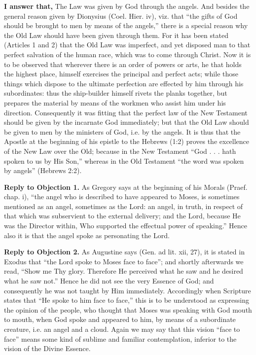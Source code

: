 \textbf{I answer that,} The Law was given by God through the angels. And besides the general reason given by Dionysius (Coel. Hier. iv), viz. that ``the gifts of God should be brought to men by means of the angels,'' there is a special reason why the Old Law should have been given through them. For it has been stated (Articles 1 and 2) that the Old Law was imperfect, and yet disposed man to that perfect salvation of the human race, which was to come through Christ. Now it is to be observed that wherever there is an order of powers or arts, he that holds the highest place, himself exercises the principal and perfect acts; while those things which dispose to the ultimate perfection are effected by him through his subordinates: thus the ship-builder himself rivets the planks together, but prepares the material by means of the workmen who assist him under his direction. Consequently it was fitting that the perfect law of the New Testament should be given by the incarnate God immediately; but that the Old Law should be given to men by the ministers of God, i.e. by the angels. It is thus that the Apostle at the beginning of his epistle to the Hebrews (1:2) proves the excellence of the New Law over the Old; because in the New Testament ``God . . . hath spoken to us by His Son,'' whereas in the Old Testament ``the word was spoken by angels'' (Hebrews 2:2).

\textbf{Reply to Objection 1.} As Gregory says at the beginning of his Morals (Praef. chap. i), ``the angel who is described to have appeared to Moses, is sometimes mentioned as an angel, sometimes as the Lord: an angel, in truth, in respect of that which was subservient to the external delivery; and the Lord, because He was the Director within, Who supported the effectual power of speaking.'' Hence also it is that the angel spoke as personating the Lord.

\textbf{Reply to Objection 2.} As Augustine says (Gen. ad lit. xii, 27), it is stated in Exodus that ``the Lord spoke to Moses face to face''; and shortly afterwards we read, ``Show me Thy glory. Therefore He perceived what he saw and he desired what he saw not.'' Hence he did not see the very Essence of God; and consequently he was not taught by Him immediately. Accordingly when Scripture states that ``He spoke to him face to face,'' this is to be understood as expressing the opinion of the people, who thought that Moses was speaking with God mouth to mouth, when God spoke and appeared to him, by means of a subordinate creature, i.e. an angel and a cloud. Again we may say that this vision ``face to face'' means some kind of sublime and familiar contemplation, inferior to the vision of the Divine Essence.

